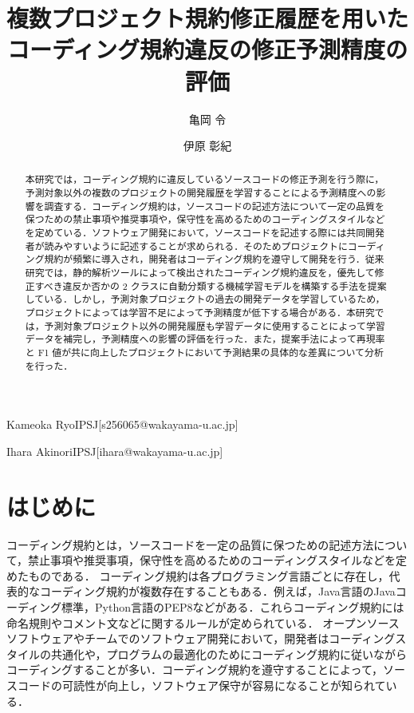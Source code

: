 \documentclass[submit,noauthor,dvipdfmx]{ipsj}
\begin{document}
\title{複数プロジェクト規約修正履歴を用いた\\コーディング規約違反の修正予測精度の評価}





\author{亀岡  令}{Kameoka Ryo}{IPSJ}[s256065@wakayama-u.ac.jp]
\author{伊原  彰紀}{Ihara Akinori}{IPSJ}[ihara@wakayama-u.ac.jp]

\begin{abstract}
本研究では，コーディング規約に違反しているソースコードの修正予測を行う際に，予測対象以外の複数のプロジェクトの開発履歴を学習することによる予測精度への影響を調査する．コーディング規約は，ソースコードの記述方法について一定の品質を保つための禁止事項や推奨事項や，保守性を高めるためのコーディングスタイルなどを定めている．ソフトウェア開発において，ソースコードを記述する際には共同開発者が読みやすいように記述することが求められる．そのためプロジェクトにコーディング規約が頻繁に導入され，開発者はコーディング規約を遵守して開発を行う．従来研究では，静的解析ツールによって検出されたコーディング規約違反を，優先して修正すべき違反か否かの 2 クラスに自動分類する機械学習モデルを構築する手法を提案している．しかし，予測対象プロジェクトの過去の開発データを学習しているため，プロジェクトによっては学習不足によって予測精度が低下する場合がある．本研究では，予測対象プロジェクト以外の開発履歴も学習データに使用することによって学習データを補完し，予測精度への影響の評価を行った．また，提案手法によって再現率と F1 値が共に向上したプロジェクトにおいて予測結果の具体的な差異について分析を行った．


\end{abstract}

\maketitle

\section{はじめに}

コーディング規約とは，ソースコードを一定の品質に保つための記述方法について，禁止事項や推奨事項，保守性を高めるためのコーディングスタイルなどを定めたものである．
コーディング規約は各プログラミング言語ごとに存在し，代表的なコーディング規約が複数存在することもある．例えば，Java言語のJavaコーディング標準，Python言語のPEP8などがある．これらコーディング規約には命名規則やコメント文などに関するルールが定められている．
オープンソースソフトウェアやチームでのソフトウェア開発において，開発者はコーディングスタイルの共通化や，プログラムの最適化のためにコーディング規約に従いながらコーディングすることが多い．コーディング規約を遵守することによって，ソースコードの可読性が向上し，ソフトウェア保守が容易になることが知られている\cite{EffectsSAT}．
\end{document}
